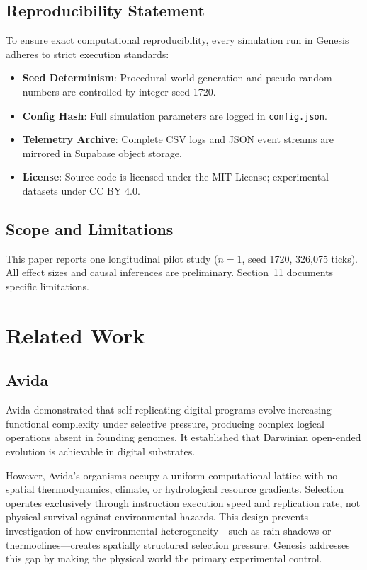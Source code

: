 \documentclass[12pt,a4paper]{article}
\begin{document}
\subsection{Reproducibility Statement}

To ensure exact computational reproducibility, every simulation run in Genesis adheres to strict execution standards:
\begin{itemize}[noitemsep]
  \item \textbf{Seed Determinism}: Procedural world generation and pseudo-random numbers are controlled by integer seed 1720.
  \item \textbf{Config Hash}: Full simulation parameters are logged in \texttt{config.json}.
  \item \textbf{Telemetry Archive}: Complete CSV logs and JSON event streams are mirrored in Supabase object storage.
  \item \textbf{License}: Source code is licensed under the MIT License; experimental datasets under CC BY 4.0.
\end{itemize}

\subsection{Scope and Limitations}

This paper reports one longitudinal pilot study ($n{=}1$, seed 1720, 326,075 ticks). All effect sizes and causal inferences are preliminary. Section~11 documents specific limitations.

\section{Related Work}

\subsection{Avida}

Avida \cite{lenski2003,ofria2004} demonstrated that self-replicating digital programs evolve increasing functional complexity under selective pressure, producing complex logical operations absent in founding genomes. It established that Darwinian open-ended evolution is achievable in digital substrates.

However, Avida's organisms occupy a uniform computational lattice with no spatial thermodynamics, climate, or hydrological resource gradients. Selection operates exclusively through instruction execution speed and replication rate, not physical survival against environmental hazards. This design prevents investigation of how environmental heterogeneity---such as rain shadows or thermoclines---creates spatially structured selection pressure. Genesis addresses this gap by making the physical world the primary experimental control.
\end{document}
